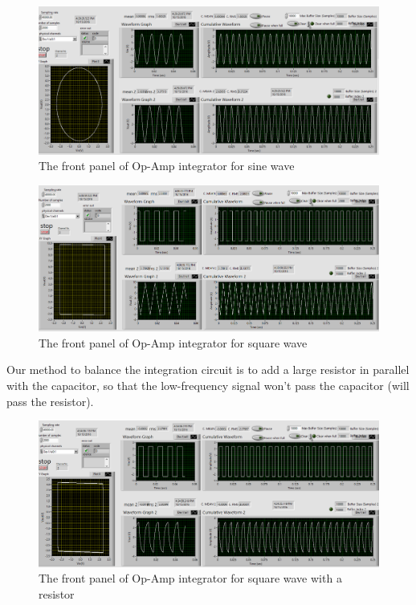 \documentclass[11pt]{article}
\begin{document}
\begin{figure}[H]
 \begin{center}
  \includegraphics[width=\linewidth/1]{act6inte_sin}
  \caption{The front panel of Op-Amp integrator for sine wave}
  \label{fig:act6inte_sin}
 \end{center}
\end{figure}

\begin{figure}[H]
 \begin{center}
  \includegraphics[width=\linewidth/1]{act6inte_square}
  \caption{The front panel of Op-Amp integrator for square wave}
  \label{fig:act6inte_square}
 \end{center}
\end{figure}

Our method to balance the integration circuit is to add a large resistor in parallel with the capacitor, so that the low-frequency signal won't pass the capacitor (will pass the resistor).

\begin{figure}[H]
 \begin{center}
  \includegraphics[width=\linewidth/1]{act6inte_square_lowResist}
  \caption{The front panel of Op-Amp integrator for square wave with a resistor}
  \label{fig:act6inte_square_lowResist}
 \end{center}
\end{figure}
\end{document}

